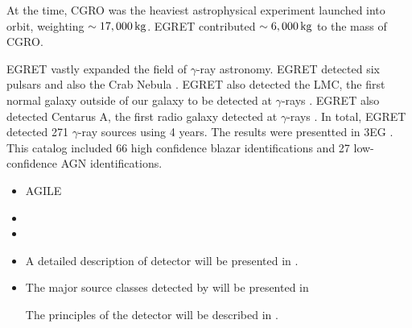 At the time, \ac{CGRO} was the heaviest astrophysical experiment
launched into orbit, weighting $\sim17,000\,\text{kg}$. \ac{EGRET}
contributed $\sim6,000\,\text{kg}$ to the mass of \ac{CGRO}.

\ac{EGRET} vastly expanded the field of $\gamma$-ray astronomy.
\ac{EGRET} detected six pulsars \citep{nolan_1996a_egret-observations} and
also the Crab Nebula \cite{nolan_1993a_observations-pulsar}.  \ac{EGRET}
also detected the LMC, the first normal galaxy outside of our galaxy to
be detected at $\gamma$-rays \citep{sreekumar_1992a_observations-large}.
\ac{EGRET} also detected Centarus A, the first radio galaxy detected
at $\gamma$-rays \cite{sreekumar_1999a_emission-nearby}.  In total,
EGRET detected 271 $\gamma$-ray sources using 4 years.  The results were
presentted in \ac{3EG} \citep{hartman_1999a_third-egret}. This catalog
included 66 high confidence blazar identifications and 27 low-confidence
AGN identifications.



\begin{itemize}
  \item AGILE
\item \fermi
  \item {}

  \item A detailed description of \fermi detector will be presented in .
  \item The major source classes detected by \fermi will be presented in  


  The principles of the detector will be described in .
\end{itemize}




